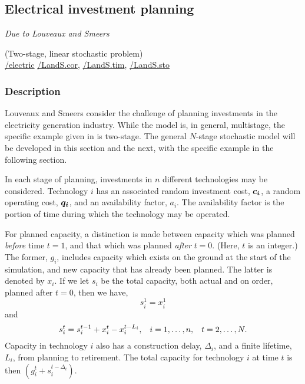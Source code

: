 \subsection{Electrical investment planning}%
\emph{Due to Louveaux and Smeers \cite{smeers88}}%

\noindent(Two-stage, linear stochastic problem)\\
\noindent \url{/electric} \url{/LandS.cor}, \url{/LandS.tim}, \url{/LandS.sto}

\vspace{3mm}
\subsubsection{Description}
Louveaux and Smeers \cite{smeers88} consider the challenge of planning investments in the electricity generation industry.  While the model is, in general, multistage, the specific example given in \cite{smeers88} is two-stage.  The general $N$-stage stochastic model will be developed in this section and the next, with the specific example in the following section.

In each stage of planning, investments in $n$ different technologies may be considered.  Technology $i$ has an associated random investment cost, $\mathbf{\boldsymbol{c_i}}$, a random operating cost, $\mathbf{\boldsymbol{q_i}}$, and an availability factor, $a_i$.  The availability factor is the portion of time during which the technology may be operated.  

For planned capacity, a distinction is made between capacity which was planned \emph{before} time $t=1$, and that which was planned \emph{after} $t=0$.  (Here, $t$ is an integer.)  The former, $g_i$, includes capacity which exists on the ground at the start of the simulation, and new capacity that has already been planned.  The latter is denoted by $x_i$.  If we let $s_i$ be the total capacity, both actual and on order, planned after $t=0$, then we have, 
\begin{equation*}
s_i^1 = x_i^1
\end{equation*}
and
\begin{equation*}
s_i^t = s_i^{t-1} + x_i^t - x_i^{t-L_i},  \hspace{3mm} i=1,\ldots,n,  \hspace{3mm} t=2,\ldots, N.
\end{equation*}
Capacity in technology $i$ also has a construction delay, $\Delta_i$, and a finite lifetime, $L_i$, from planning to retirement.  The total capacity for technology $i$ at time $t$ is then $(g_i^t + s_i^{t-\Delta_i})$.  

